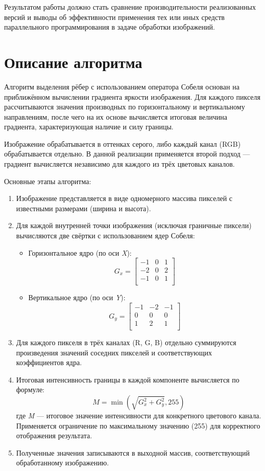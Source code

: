 \documentclass[14pt,a4paper]{extarticle}
\begin{document}
Результатом работы должно стать сравнение производительности реализованных версий и выводы об эффективности применения тех или иных средств параллельного программирования в задаче обработки изображений.

\section{Описание алгоритма}

Алгоритм выделения рёбер с использованием оператора Собеля основан на приближённом вычислении градиента яркости изображения. Для каждого пикселя рассчитываются значения производных по горизонтальному и вертикальному направлениям, после чего на их основе вычисляется итоговая величина градиента, характеризующая наличие и силу границы.

Изображение обрабатывается в оттенках серого, либо каждый канал (RGB) обрабатывается отдельно. В данной реализации применяется второй подход — градиент вычисляется независимо для каждого из трёх цветовых каналов.

Основные этапы алгоритма:

\begin{enumerate}
    \item Изображение представляется в виде одномерного массива пикселей с известными размерами (ширина и высота).
    \item Для каждой внутренней точки изображения (исключая граничные пиксели) вычисляются две свёртки с использованием ядер Собеля:
    \begin{itemize}
        \item Горизонтальное ядро (по оси \emph{X}):
        \[
        G_x =
        \begin{bmatrix}
        -1 & 0 & 1 \\
        -2 & 0 & 2 \\
        -1 & 0 & 1 \\
        \end{bmatrix}
        \]
        \item Вертикальное ядро (по оси \emph{Y}):
        \[
        G_y =
        \begin{bmatrix}
        -1 & -2 & -1 \\
         0 &  0 &  0 \\
         1 &  2 &  1 \\
        \end{bmatrix}
        \]
    \end{itemize}
    \item Для каждого пикселя в трёх каналах (R, G, B) отдельно суммируются произведения значений соседних пикселей и соответствующих коэффициентов ядра.
    \item Итоговая интенсивность границы в каждой компоненте вычисляется по формуле:
    \[
    M = \min\left(\sqrt{G_x^2 + G_y^2}, 255\right)
    \]
    где \emph{M} — итоговое значение интенсивности для конкретного цветового канала. Применяется ограничение по максимальному значению (255) для корректного отображения результата.
    \item Полученные значения записываются в выходной массив, соответствующий обработанному изображению.
\end{enumerate}
\end{document}
